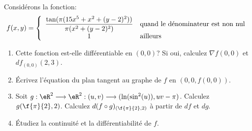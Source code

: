 
\begin{exercice}\label{exo0059}

Considérons la fonction:\[f(x,y)=\left\{\begin{array}{cl}
                        \dfrac{\tan(\pi(15x^5+x^2+(y-2)^2))}{\pi(x^2+(y-2)^2)} & {\rm quand \ le \ d\acute{e}nominateur \ est \ non \ nul}  \\
                        1             						    & {\rm ailleurs}
                        \end{array}\right.\]	
 
 \begin{enumerate}
 \item  Cette fonction est-elle différentiable en $(0,0)$? Si oui, calculez  $\nabla f(0,0)$ et $df_{(0,0)}(2,3)$. 
 
 \item Écrivez l'équation du plan tangent au graphe de $f$ en $(0,0,f(0,0))$.  
 \item Soit $g:\eR^2\longrightarrow\eR^2:(u,v)\longrightarrow(\ln(\sin^2(u)),uv-\pi)$. Calculez $g(\f{\pi}{2}, 2)$. Calculez $d(f\circ g)_{(\f{\pi}{2},2)}$ à partir de $df$ et $dg$. 
 
 \item Étudiez la continuité et la différentiabilité de $f$. 
\end{enumerate}

\end{exercice}
